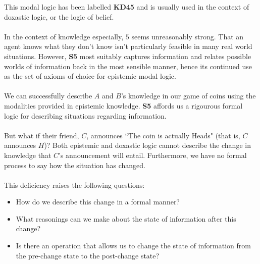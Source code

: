 \documentclass[10pt, a4paper, twoside]{article}
\begin{document}
This modal logic has been labelled {\bf KD45} and is usually used in the context
of doxastic logic, or the logic of belief.\\
\\
In the context of knowledge especially, $5$ seems unreasonably strong.
That an agent knows what they don't know isn't particularly feasible in many
real world situations.
However, {\bf S5} most suitably captures information and relates possible
worlds of information back in the most sensible manner, hence its continued use
as the set of axioms of choice for epistemic modal logic.\\
\\
We can successfully describe $A$ and $B$'s knowledge in our game of coins using
the modalities provided in epistemic knowledge.
{\bf S5} affords us a rigourous formal logic for describing situations regarding
information.\\
\\
But what if their friend, $C$, announces ``The coin is actually Heads" (that is,
$C$ announces $H$)?
Both epistemic and doxastic logic cannot describe the change in knowledge that
$C$'s announcement will entail.
Furthermore, we have no formal process to say how the situation has changed.\\
\\
This deficiency raises the following questions:
\begin{itemize}
	\item How do we describe this change in a formal manner?
	\item What reasonings can we make about the state of information after this
	change?
	\item Is there an operation that allows us to change the state of information
	from the pre-change state to the post-change state?
\end{itemize}
\end{document}
